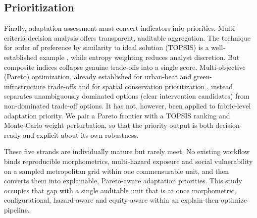 \subsection{Prioritization}
\label{sec:bg-mcda}
Finally, adaptation assessment must convert indicators into priorities.
Multi-criteria decision analysis offers transparent, auditable aggregation. The
technique for order of preference by similarity to ideal solution (TOPSIS) is a
well-established example \citep{hwang1981MultipleAttribute}, while entropy
weighting reduces analyst discretion. But composite indices collapse genuine
trade-offs into a single score. Multi-objective (Pareto) optimization, already
established for urban-heat and green-infrastructure trade-offs
\citep{zhang2024MultiObjective, zhu2025SpongeCities} and for spatial conservation
prioritization \citep{schroter2016SpatialPrioriti}, instead separates
unambiguously dominated options (clear intervention candidates) from non-dominated
trade-off options. It has not, however, been applied to fabric-level adaptation
priority. We pair a Pareto frontier with a TOPSIS ranking and Monte-Carlo weight
perturbation, so that the priority output is both decision-ready and explicit
about its own robustness.

These five strands are individually mature but rarely meet. No existing workflow
binds reproducible morphometrics, multi-hazard exposure and social vulnerability
on a sampled metropolitan grid within one commensurable unit, and then converts
them into explainable, Pareto-aware adaptation priorities. This study occupies
that gap with a single auditable unit that is at once morphometric,
configurational, hazard-aware and equity-aware within an explain-then-optimize
pipeline.
